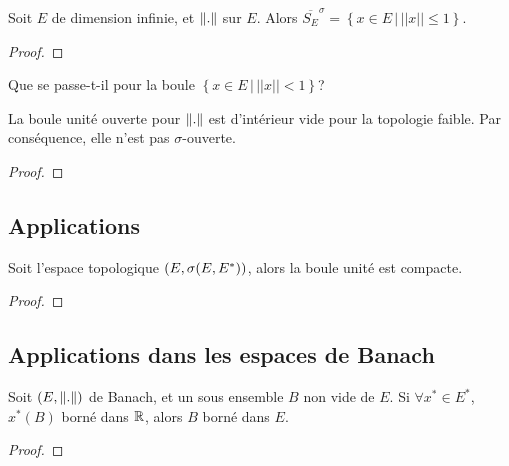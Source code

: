\begin{proposition}
	Soit $E$ de dimension infinie, et $\norm{.}$ sur $E$. Alors
	$\overline{S_{E}}^{\sigma} = \left\{ x \in E \, | \, ||x|| \leq 1 \right\}$.
\end{proposition}

\ifdefined\outputproof
\begin{proof}

\end{proof}
\fi

Que se passe-t-il pour la boule $\left\{ x \in E \, | \, ||x|| < 1 \right\}$?

\begin{proposition}
	La boule unité ouverte pour $\norm{.}$ est d'intérieur vide pour la
	topologie faible. Par conséquence, elle n'est pas $\sigma$-ouverte.
\end{proposition}

\ifdefined\outputproof
\begin{proof}

\end{proof}
\fi

\subsection{Applications}

\begin{theorem}
	Soit l'espace topologique $(E, \sigma(E, E^{*}))$, alors la boule unité
	est compacte.
\end{theorem}

\ifdefined\outputproof
\begin{proof}

\end{proof}
\fi

\subsection{Applications dans les espaces de Banach}

\begin{proposition}
	Soit $(E, \norm{.})$ de Banach, et un sous ensemble $B$ non
	vide de $E$.
	Si $\forall x^{*} \in E^{*}$, $x^{*}(B)$ borné dans $\mathbb{R}$, alors $B$ borné
	dans $E$.
\end{proposition}

\ifdefined\outputproof
\begin{proof}

\end{proof}
\fi

